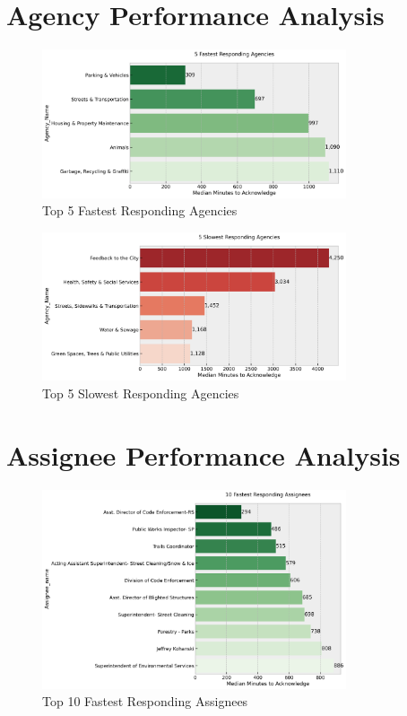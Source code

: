 \documentclass[12pt]{report}
\begin{document}
\section{Agency Performance Analysis}

\begin{figure}[H]
\centering
\includegraphics[width=0.8\textwidth]{fastest_agencies}
\caption{Top 5 Fastest Responding Agencies}
\label{fig:fast_agencies}
\end{figure}

\begin{figure}[H]
\centering
\includegraphics[width=0.8\textwidth]{slowest_agencies}
\caption{Top 5 Slowest Responding Agencies}
\label{fig:slow_agencies}
\end{figure}

\section{Assignee Performance Analysis}

\begin{figure}[H]
\centering
\includegraphics[width=0.8\textwidth]{fastest_assignees}
\caption{Top 10 Fastest Responding Assignees}
\label{fig:fast_assignees}
\end{figure}
\end{document}
